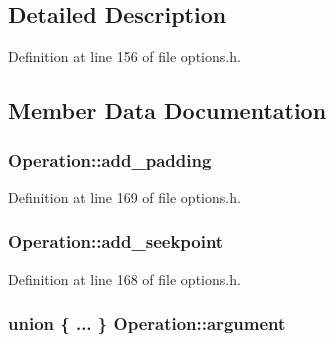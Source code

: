 \begin{DoxyCompactItemize}
\begin{tabbing}
\end{tabbing}\end{DoxyCompactItemize}


\subsection{Detailed Description}


Definition at line 156 of file options.\+h.



\subsection{Member Data Documentation}
\subsubsection[{\texorpdfstring{add\+\_\+padding}{add_padding}}]{ Operation\+::add\+\_\+padding}\hypertarget{struct_operation_a4ae2e779c7d818bdc3752a235b576e21}{}\label{struct_operation_a4ae2e779c7d818bdc3752a235b576e21}


Definition at line 169 of file options.\+h.

\subsubsection[{\texorpdfstring{add\+\_\+seekpoint}{add_seekpoint}}]{ Operation\+::add\+\_\+seekpoint}\hypertarget{struct_operation_abb3b6aab9b60a48c75fec2c366053f8f}{}\label{struct_operation_abb3b6aab9b60a48c75fec2c366053f8f}


Definition at line 168 of file options.\+h.

\subsubsection[{\texorpdfstring{argument}{argument}}]{\setlength{\rightskip}{0pt plus 5cm}union \{ ... \}   Operation\+::argument}\hypertarget{struct_operation_a1e7b272c2e26a7ef9ab0b3d01005182b}{}\label{struct_operation_a1e7b272c2e26a7ef9ab0b3d01005182b}
